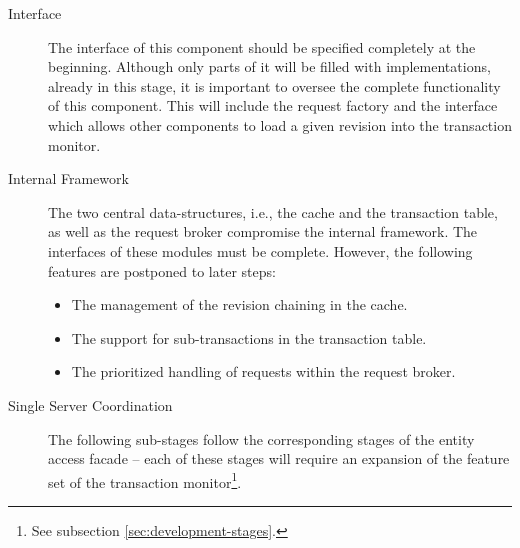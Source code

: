 \documentclass[a4paper, 10pt]{book}
\begin{document}
                                \begin{description}
                                    \item[Interface] The interface of this component should be specified
                                        completely at the beginning. Although only parts of it will be
                                        filled with implementations, already in this stage, it is important
                                        to oversee the complete functionality of this component. 
                                        This will include the request factory and the interface which allows
                                        other components to load a given revision into the transaction
                                        monitor. 
                                    \item[Internal Framework] The two central data-structures, i.e., the
                                        cache and the transaction table, as well as the request broker
                                        compromise the internal framework. The interfaces of these modules
                                        must be complete. However, the following features are postponed to
                                        later steps:
                                        \begin{itemize}
                                            \item The management of the revision chaining in the cache.
                                            \item The support for sub-transactions in the transaction table.
                                            \item The prioritized handling of requests within the request
                                                broker.
                                        \end{itemize}
                                    \item[Single Server Coordination] The following sub-stages follow the
                                        corresponding stages of the entity access facade -- each of these
                                        stages will require an expansion of the feature set of the
                                        transaction monitor\footnote{See subsection
                                        \vref{sec:development-stages}.}.
                                        \begin{itemize}

\end{itemize}
\end{description}
\end{document}
